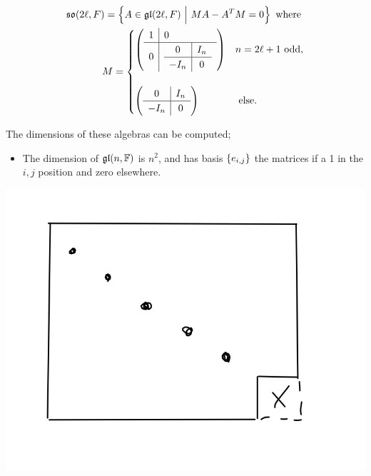 \begin{align*}
{\mathfrak{so}}(2\ell, F) = \left\{{A \in {\mathfrak{gl}}(2\ell, F){~\mathrel{\Big|}~} MA-A^{T}M = 0}\right\} \text{ where } \\
M = \begin{cases}
\left(\begin{array}{l|l}
{1} & {0} \\ \hline
{0} & {\begin{array}{c|c}{0} & {I_{n}} \\\hline {-I_{n}} & {0}\end{array}}
\end{array}\right) & n=2\ell + 1 \text{ odd},\\ \\
\left(\begin{array}{c|c}{0} & {I_{n}} \\ \hline {-I_{n}} & {0}\end{array}\right) & \text{ else}.
\end{cases}
\end{align*}


 The dimensions of these algebras can be
computed;

\begin{itemize}
\tightlist
\item
  The dimension of \({\mathfrak{gl}}(n, {\mathbb{F}})\) is \(n^{2}\), and has basis
  \({\left\{{e_{{i,j}}}\right\}}\) the matrices if a 1 in the \(i,j\) position
  and zero elsewhere.
\end{itemize}

\includegraphics{figures/2019-08-17-01:40.png}\\

